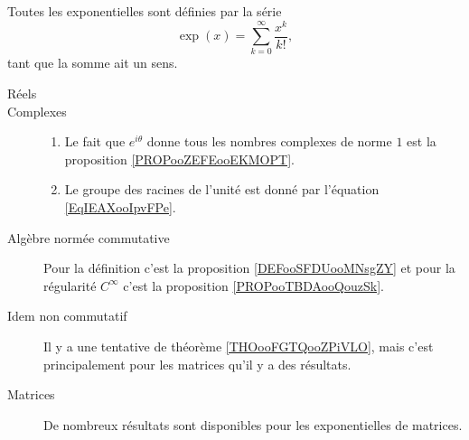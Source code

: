         \label{THEMEooKXSGooCsQNoY}

Toutes les exponentielles sont définies par la série
\begin{equation}
    \exp(x)=\sum_{k=0}^{\infty}\frac{ x^k }{ k! },
\end{equation}
tant que la somme ait un sens.

\begin{description}
    \item[Réels]

    \item[Complexes]

        \begin{enumerate}
            \item
                Le fait que \(  e^{i\theta}\) donne tous les nombres complexes de norme \( 1\) est la proposition \ref{PROPooZEFEooEKMOPT}.
            \item
                Le groupe des racines de l'unité est donné par l'équation \eqref{EqIEAXooIpvFPe}.
        \end{enumerate}

    \item[Algèbre normée commutative]

        Pour la définition c'est la proposition \ref{DEFooSFDUooMNsgZY} et pour la régularité \(  C^{\infty}\) c'est la proposition \ref{PROPooTBDAooQouzSk}.

    \item[Idem non commutatif]

        Il y a une tentative de théorème \ref{THOooFGTQooZPiVLO}, mais c'est principalement pour les matrices qu'il y a des résultats.

    \item[Matrices] 

        De nombreux résultats sont disponibles pour les exponentielles de matrices.


\end{description}
